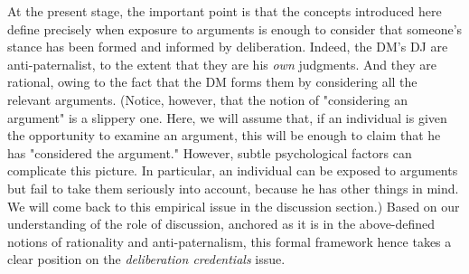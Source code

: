 \documentclass[a4paper, 11pt]{article}
\begin{document}
At the present stage, the important point is that the concepts introduced here define precisely when exposure to arguments is enough to consider that someone’s stance has been formed and informed by deliberation. Indeed, the \ac{DM}'s \ac{DJ} are anti-paternalist, to the extent that they are his \emph{own} judgments. And they are rational, owing to the fact that the \ac{DM} forms them by considering all the relevant arguments. (Notice, however, that the notion of "considering an argument" is a slippery one. Here, we will assume that, if an individual is given the opportunity to examine an argument, this will be enough to claim that he has "considered the argument." However, subtle psychological factors can complicate this picture. In particular, an individual can be exposed to arguments but fail to take them seriously into account, because he has other things in mind. We will come back to this empirical issue in the discussion section.) Based on our understanding of the role of discussion, anchored as it is in the above-defined notions of rationality and anti-paternalism, this formal framework hence takes a clear position on the \emph{deliberation credentials} issue.  


\end{document}
